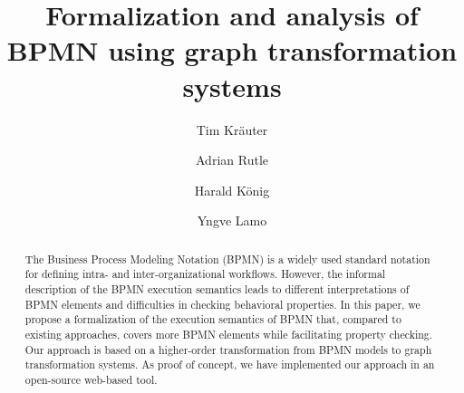 \documentclass[runningheads]{llncs}
\begin{document}
%
\title{Formalization and analysis of BPMN using graph transformation systems}
%
%
\author{Tim Kr\"{a}uter \and
Adrian Rutle \and
Harald K\"{o}nig \and
Yngve Lamo}
%
%
\maketitle              %
%
\begin{abstract}
The Business Process Modeling Notation (BPMN) is a widely used standard notation for defining intra- and inter-organizational workflows.
However, the informal description of the BPMN execution semantics leads to different interpretations of BPMN elements and difficulties in checking behavioral properties.
In this paper, we propose a formalization of the execution semantics of BPMN that, compared to existing approaches, covers more BPMN elements while facilitating property checking.
Our approach is based on a higher-order transformation from BPMN models to graph transformation systems.
As proof of concept, we have implemented our approach in an open-source web-based tool.

\end{abstract}
\end{document}
